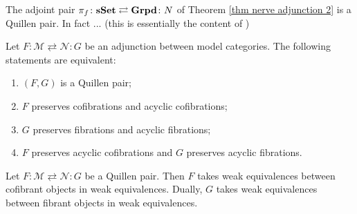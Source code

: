 \begin{refsection}

\begin{eg} \label{eg groupoids}
The adjoint pair $\pi_f \colon \mathbf{s\,\!\mathbf{Set}} \rightleftarrows \mathbf{Grpd} \colon N$ of Theorem \ref{thm nerve adjunction 2} is a Quillen pair. In fact ... (this is essentially the content of \cite[Lemma 3.3]{hollander})
\end{eg}

\begin{cor} \label{cor Quillen pair}
Let $F \colon \mathcal M \rightleftarrows \mathcal N \colon G$ be an adjunction between model categories. The following statements are equivalent:
\begin{enumerate}
\item $(F,G)$ is a Quillen pair;
\item $F$ preserves cofibrations and acyclic cofibrations;
\item $G$ preserves fibrations and acyclic fibrations;
\item $F$ preserves acyclic cofibrations and $G$ preserves acyclic fibrations.
\end{enumerate}
\end{cor}

\begin{cor}
Let $F \colon \mathcal M \rightleftarrows \mathcal N \colon G$ be a Quillen pair. Then $F$ takes weak equivalences between cofibrant objects in weak equivalences. Dually, $G$ takes weak equivalences between fibrant objects in weak equivalences.
\end{cor}


\end{refsection}
